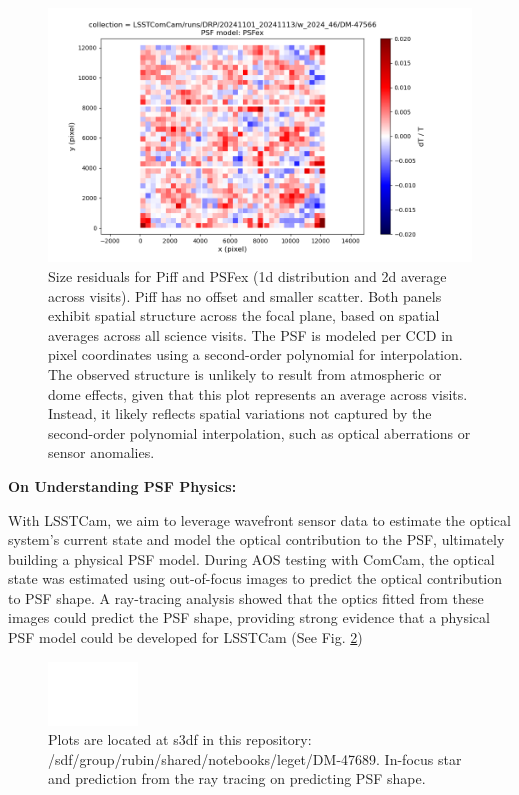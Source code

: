 \begin{figure}
	\includegraphics[scale=0.3]{figures/0_dT_2d_PSFex}
        \caption{\small Size residuals for Piff and PSFex (1d distribution and 2d average across visits). Piff has no offset and smaller scatter. Both panels 
        exhibit spatial structure across the focal plane, based on spatial averages across all science visits. The PSF is modeled per CCD in pixel coordinates 
        using a second-order polynomial for interpolation. The observed structure is unlikely to result from atmospheric or dome effects, given that this plot 
        represents an average across visits. Instead, it likely reflects spatial variations not captured by the second-order polynomial interpolation, such as 
        optical aberrations or sensor anomalies.}
        \label{DT_plot}
\end{figure}


\textbf{On Understanding PSF Physics:}


With LSSTCam, we aim to leverage wavefront sensor data to estimate the optical system's current state and model the optical contribution to the PSF, ultimately building a physical PSF model. During AOS testing with ComCam, the optical state was estimated using out-of-focus images to predict the optical contribution to PSF shape. A ray-tracing analysis showed that the optics fitted from these images could predict the PSF shape, providing strong evidence that a physical PSF model could be developed for LSSTCam (See  Fig. \ref{PSF_plot})


\begin{figure}
        \centering
        \includegraphics[scale=0.47]{figures/PSF_plot}
        \caption{\small Plots are located at s3df in this repository: /sdf/group/rubin/shared/notebooks/leget/DM-47689.  In-focus star and prediction from the ray tracing on predicting PSF shape.}
        \label{PSF_plot}
\end{figure}